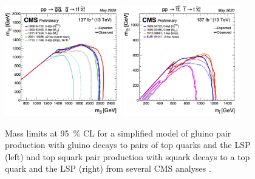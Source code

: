\begin{figure}
\centering
\includegraphics[width=0.45\textwidth]{figures/intro/gluino_mass_limits.png}
\includegraphics[width=0.45\textwidth]{figures/intro/stop_mass_limits.png}
\caption{Mass limits at \SI{95}{\percent} CL for a simplified model of gluino pair production with gluino decays to pairs of top quarks and the LSP (left) and top squark pair production with squark decays to a top quark and the LSP (right) from several CMS analyses \cite{cms_susy_public_results}.}
\label{cms_susy_summary}
\end{figure}